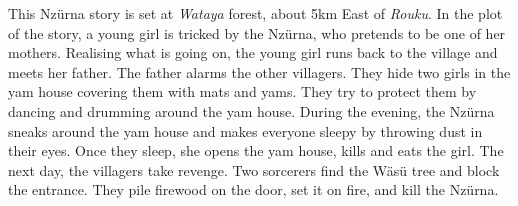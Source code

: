This Nzürna story is set at \textit{Wataya} forest, about 5km East of \textit{Rouku}. In the plot of the story, a young girl is tricked by the Nzürna, who pretends to be one of her mothers. Realising what is going on, the young girl runs back to the village and meets her father. The father alarms the other villagers. They hide two girls in the yam house covering them with mats and yams. They try to protect them by dancing and drumming around the yam house. During the evening, the Nzürna sneaks around the yam house and makes everyone sleepy by throwing dust in their eyes. Once they sleep, she opens the yam house, kills and eats the girl. The next day, the villagers take revenge. Two sorcerers find the Wäsü tree and block the entrance. They pile firewood on the door, set it on fire, and kill the Nzürna.